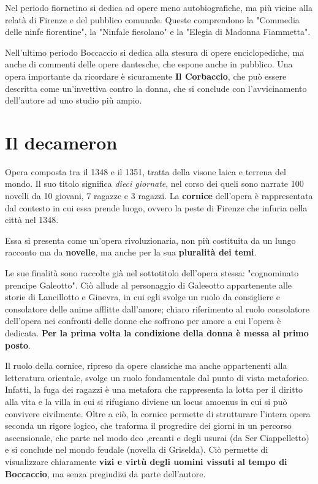 \documentclass[10pt,a4paper]{article}
\begin{document}
	 Nel periodo fiornetino si dedica ad opere meno autobiografiche, ma più vicine alla relatà di Firenze e del pubblico comunale. Queste comprendono la "Commedia delle ninfe fiorentine", la "Ninfale fiesolano" e la "Elegia di Madonna Fiammetta".

	 Nell'ultimo periodo Boccaccio si dedica alla stesura di opere enciclopediche, ma anche di commenti delle opere dantesche, che espone anche in pubblico. Una opera importante da ricordare è sicuramente \textbf{Il Corbaccio}, che può essere descritta come un'invettiva contro la donna, che si conclude con l'avvicinamento dell'autore ad uno studio più ampio.

	 \section{Il decameron}

	 Opera composta tra il 1348 e il 1351, tratta della visone laica e terrena del mondo. Il suo titolo significa \textit{dieci giornate}, nel corso dei queli sono narrate 100 novelli da 10 giovani, 7 ragazze e 3 ragazzi. La \textbf{cornice} dell'opera è rappresentata dal contesto in cui essa prende luogo, ovvero la peste di Firenze che infuria nella città nel 1348.

	 Essa si presenta come un'opera rivoluzionaria, non più costituita da un lungo racconto ma da \textbf{novelle}, ma anche per la sua \textbf{pluralità dei temi}.

		Le sue finalità sono raccolte già nel sottotitolo dell'opera stessa: "cognominato prencipe Galeotto". Ciò allude al personaggio di Galeeotto appartenente alle storie di Lancillotto e Ginevra, in cui egli svolge un ruolo da consigliere e consolatore delle anime afflitte dall'amore; chiaro riferimento al ruolo consolatore dell'opera nei confronti delle donne che soffrono per amore a cui l'opera è dedicata. \textbf{Per la prima volta la condizione della donna è messa al primo posto}.

		Il ruolo della cornice, ripreso da opere classiche ma anche appartenenti alla letteratura orientale, svolge un ruolo fondamentale dal punto di vista metaforico. Infatti, la fuga dei ragazzi è una metafora che rappresenta la lotta per il diritto alla vita e la villa in cui si rifugiano diviene un locus amoenus in cui si può convivere civilmente.
		Oltre a ciò, la cornice permette di strutturare l'intera opera seconda un rigore logico, che traforma il progredire dei giorni in un percorso ascensionale, che parte nel modo deo ,ercanti e degli usurai (da Ser Ciappelletto) e si conclude nel mondo feudale (novella di Griselda). Ciò permette di visualizzare chiaramente \textbf{vizi e virtù degli uomini vissuti al tempo di Boccaccio}, ma senza pregiudizi da parte dell'autore.
\end{document}
